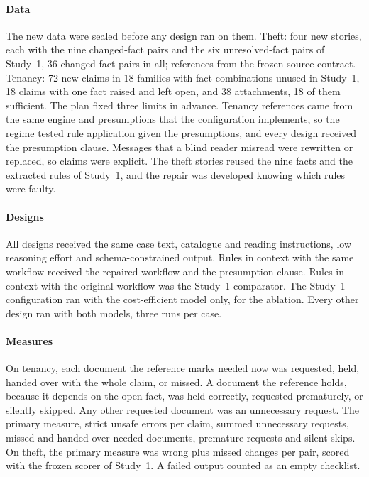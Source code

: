 \paragraph{Data}
The new data were sealed before any design ran on them. Theft: four new stories, each with the nine changed-fact pairs and the six unresolved-fact pairs of Study~1, 36 changed-fact pairs in all; references from the frozen source contract. Tenancy: 72 new claims in 18 families with fact combinations unused in Study~1, 18 claims with one fact raised and left open, and 38 attachments, 18 of them sufficient. The plan fixed three limits in advance. Tenancy references came from the same engine and presumptions that the configuration implements, so the regime tested rule application given the presumptions, and every design received the presumption clause. Messages that a blind reader misread were rewritten or replaced, so claims were explicit. The theft stories reused the nine facts and the \rvRules{} extracted rules of Study~1, and the repair was developed knowing which rules were faulty.

\paragraph{Designs}
All designs received the same case text, catalogue and reading instructions, low reasoning effort and schema-constrained output. Rules in context with the same workflow received the repaired workflow and the presumption clause. Rules in context with the original workflow was the Study~1 comparator. The Study~1 configuration ran with the cost-efficient model only, for the ablation. Every other design ran with both models, three runs per case.

\paragraph{Measures}
On tenancy, each document the reference marks needed now was requested, held, handed over with the whole claim, or missed. A document the reference holds, because it depends on the open fact, was held correctly, requested prematurely, or silently skipped. Any other requested document was an unnecessary request. The primary measure, strict unsafe errors per claim, summed unnecessary requests, missed and handed-over needed documents, premature requests and silent skips. On theft, the primary measure was wrong plus missed changes per pair, scored with the frozen scorer of Study~1. A failed output counted as an empty checklist.


